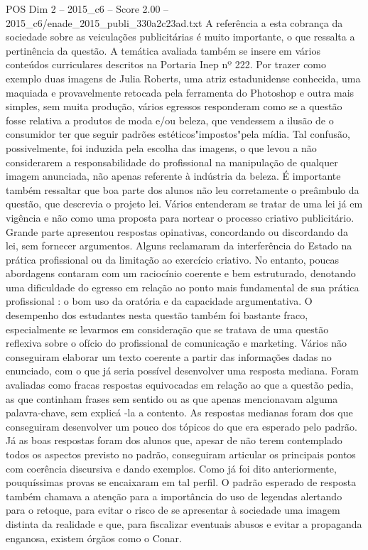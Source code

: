 \begin{textsample}{POS Dim 2 – 2015\_c6 – Score 2.00 – 2015\_c6/enade\_2015\_publi\_330a2c23ad.txt}
A referência a esta cobrança da sociedade sobre as veiculações publicitárias é muito importante, o que ressalta a pertinência da questão.
A temática avaliada também se insere em vários conteúdos curriculares descritos na Portaria Inep nº 222.
Por trazer como exemplo duas imagens de Julia Roberts, uma atriz estadunidense conhecida, uma maquiada e provavelmente retocada pela ferramenta do Photoshop e outra mais simples, sem muita produção, vários egressos responderam como se a questão fosse relativa a produtos de moda e/ou beleza, que vendessem a ilusão de o consumidor ter que seguir padrões estéticos"impostos"pela mídia.
Tal confusão, possivelmente, foi induzida pela escolha das imagens, o que levou a não considerarem a responsabilidade do profissional na manipulação de qualquer imagem anunciada, não apenas referente à indústria da beleza.
É importante também ressaltar que boa parte dos alunos não leu corretamente o preâmbulo da questão, que descrevia o projeto lei.
Vários entenderam se tratar de uma lei já em vigência e não como uma proposta para nortear o processo criativo publicitário.
Grande parte apresentou respostas opinativas, concordando ou discordando da lei, sem fornecer argumentos.
Alguns reclamaram da interferência do Estado na prática profissional ou da limitação ao exercício criativo.
No entanto, poucas abordagens contaram com um raciocínio coerente e bem estruturado, denotando uma dificuldade do egresso em relação ao ponto mais fundamental de sua prática profissional : o bom uso da oratória e da capacidade argumentativa.
O desempenho dos estudantes nesta questão também foi bastante fraco, especialmente se levarmos em consideração que se tratava de uma questão reflexiva sobre o ofício do profissional de comunicação e marketing.
Vários não conseguiram elaborar um texto coerente a partir das informações dadas no enunciado, com o que já seria possível desenvolver uma resposta mediana.
Foram avaliadas como fracas respostas equivocadas em relação ao que a questão pedia, as que continham frases sem sentido ou as que apenas mencionavam alguma palavra-chave, sem explicá -la a contento.
As respostas medianas foram dos que conseguiram desenvolver um pouco dos tópicos do que era esperado pelo padrão.
Já as boas respostas foram dos alunos que, apesar de não terem contemplado todos os aspectos previsto no padrão, conseguiram articular os principais pontos com coerência discursiva e dando exemplos.
Como já foi dito anteriormente, pouquíssimas provas se encaixaram em tal perfil.
O padrão esperado de resposta também chamava a atenção para a importância do uso de legendas alertando para o retoque, para evitar o risco de se apresentar à sociedade uma imagem distinta da realidade e que, para fiscalizar eventuais abusos e evitar a propaganda enganosa, existem órgãos como o Conar.

\end{textsample}
